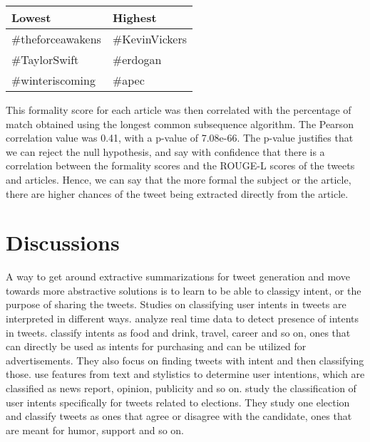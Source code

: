 \begin{table}[htbp]
\centering
\begin{tabular}{|l|l|}
\hline
Lowest  & Highest  \\ \hline
\#theforceawakens       & \#KevinVickers           \\
\#TaylorSwift           & \#erdogan                \\
\#winteriscoming        & \#apec                  \\ \hline
\end{tabular}
\label{tab:formal}
\end{table}

This formality score for each article was then correlated with the percentage of match obtained using the longest common subsequence algorithm. The Pearson correlation value was 0.41, with a p-value of 7.08e-66. The p-value justifies that we can reject the null hypothesis, and say with confidence that there is a correlation between the formality scores and the ROUGE-L scores of the tweets and articles. Hence, we can say that the more formal the subject or the article, there are higher chances of the tweet being extracted directly from the article.

\section{Discussions}

A way to get around extractive summarizations for tweet generation and move towards more abstractive solutions is to learn to be able to classigy intent, or the purpose of sharing the tweets. Studies on classifying user intents in tweets are interpreted in different ways.  analyze real time data to detect presence of intents in tweets.  classify intents as food and drink, travel, career and so on, ones that can directly be used as intents for purchasing and can be utilized for advertisements. They also focus on finding tweets with intent and then classifying those.  use features from text and stylistics to determine user intentions, which are classified as news report, opinion, publicity and so on.  study the classification of user intents specifically for tweets related to elections. They study one election and classify tweets as ones that agree or disagree with the candidate, ones that are meant for humor, support and so on. 

